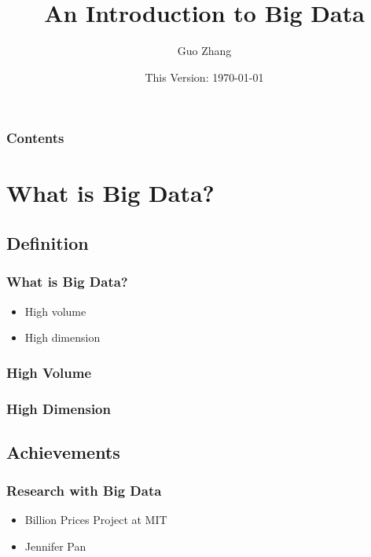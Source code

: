 \documentclass{beamer}
\title{An Introduction to Big Data}
\subtitle{}
\author{Guo Zhang}
\institute{China's Prices Project at Xiamen University}
\date{This Version: \today}
\begin{document}
\begin{frame}
\maketitle
\end{frame}

\begin{frame}[plain]
\frametitle{Contents}
\tableofcontents[hideallsubsections]
\end{frame}

\section{What is Big Data?}
\subsection{Definition %
}
\begin{frame}
\frametitle{What is Big Data?}
\begin{itemize}
\item High volume
\item High dimension
\end{itemize}
\end{frame}

\begin{frame}
\frametitle{High Volume}
\end{frame}

\begin{frame}
\frametitle{High Dimension}
\end{frame}

\subsection{Achievements %
} 
\begin{frame}
\frametitle{Research with Big Data}
\begin{itemize}
\item Billion Prices Project at MIT \footnotemark {}
\item Jennifer Pan\footnotemark {}
\end{itemize}
\end{frame}
\end{document}
